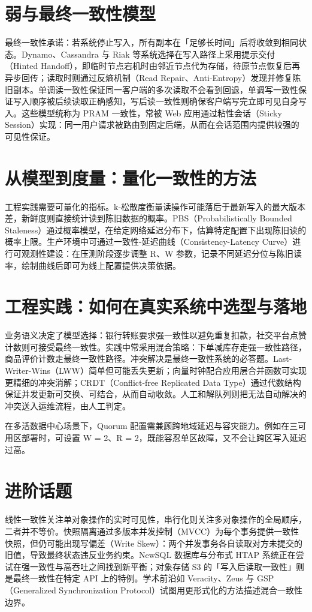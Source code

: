 \chapter{弱与最终一致性模型}
最终一致性承诺：若系统停止写入，所有副本在「足够长时间」后将收敛到相同状态。Dynamo、Cassandra 与 Riak 等系统选择在写入路径上采用提示交付（Hinted Handoff），即临时节点宕机时由邻近节点代为存储，待原节点恢复后再异步回传；读取时则通过反熵机制（Read Repair、Anti-Entropy）发现并修复陈旧副本。单调读一致性保证同一客户端的多次读取不会看到回退，单调写一致性保证写入顺序被后续读取正确感知，写后读一致性则确保客户端写完立即可见自身写入。这些模型统称为 PRAM 一致性，常被 Web 应用通过粘性会话（Sticky Session）实现：同一用户请求被路由到固定后端，从而在会话范围内提供较强的可见性保证。\par
\chapter{从模型到度量：量化一致性的方法}
工程实践需要可量化的指标。k-松散度衡量读操作可能落后于最新写入的最大版本差，新鲜度则直接统计读到陈旧数据的概率。PBS（Probabilistically Bounded Staleness）通过概率模型，在给定网络延迟分布下，估算特定配置下出现陈旧读的概率上限。生产环境中可通过一致性-延迟曲线（Consistency-Latency Curve）进行可观测性建设：在压测阶段逐步调整 R、W 参数，记录不同延迟分位与陈旧读率，绘制曲线后即可为线上配置提供决策依据。\par
\chapter{工程实践：如何在真实系统中选型与落地}
业务语义决定了模型选择：银行转账要求强一致性以避免重复扣款，社交平台点赞计数则可接受最终一致性。实践中常采用混合策略：下单减库存走强一致性路径，商品评价计数走最终一致性路径。冲突解决是最终一致性系统的必答题。Last-Writer-Wins（LWW）简单但可能丢失更新；向量时钟配合应用层合并函数可实现更精细的冲突消解；CRDT（Conflict-free Replicated Data Type）通过代数结构保证并发更新可交换、可结合，从而自动收敛。人工和解队列则把无法自动解决的冲突送入运维流程，由人工判定。\par
在多活数据中心场景下，Quorum 配置需兼顾跨地域延迟与容灾能力。例如在三可用区部署时，可设置 W = 2、R = 2，既能容忍单区故障，又不会让跨区写入延迟过高。\par
\chapter{进阶话题}
线性一致性关注单对象操作的实时可见性，串行化则关注多对象操作的全局顺序，二者并不等价。快照隔离通过多版本并发控制（MVCC）为每个事务提供一致性快照，但仍可能出现写偏差（Write Skew）：两个并发事务各自读取对方未提交的旧值，导致最终状态违反业务约束。NewSQL 数据库与分布式 HTAP 系统正在尝试在强一致性与高吞吐之间找到新平衡；对象存储 S3 的「写入后读取一致性」则是最终一致性在特定 API 上的特例。学术前沿如 Veracity、Zeus 与 GSP（Generalized Synchronization Protocol）试图用更形式化的方法描述混合一致性边界。\par
